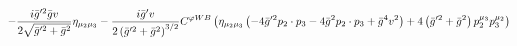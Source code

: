 %
\begin{dmath*}
%
  -  \frac{i {\bar g}^{\prime 2} {\bar g}{} v}{2 \sqrt{{\bar g}^{\prime 2} + {\bar g}{}^2}}\eta_{\mu_2 \mu_3}  -  \frac{i {\bar g}^\prime v}{2 \left({\bar g}^{\prime 2} + {\bar g}{}^2\right)^{3/2}}C^{ \varphi  WB} \left(\eta_{\mu_2 \mu_3} \left( - 4 {\bar g}^{\prime 2} p_{2}\nobreak\cdot\nobreak{}p_{3} - 4 {\bar g}{}^2 p_{2}\nobreak\cdot\nobreak{}p_{3} + {\bar g}{}^4 v^2\right) + 4 \left({\bar g}^{\prime 2} + {\bar g}{}^2\right) p_2^{\mu_3} p_3^{\mu_2}\right)
%
\end{dmath*}
%

